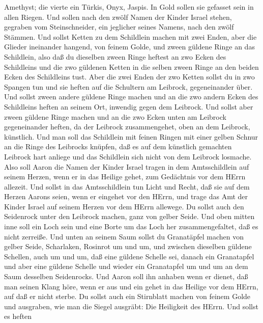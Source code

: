 Amethyst;  die vierte ein Türkis, Onyx, Jaspis. In Gold
sollen sie gefasset sein in allen Riegen.  Und sollen nach
den zwölf Namen der Kinder Israel stehen, gegraben vom Steinschneider,
ein jeglicher seines Namens, nach den zwölf Stämmen.  Und
sollst Ketten zu dem Schildlein machen mit zwei Enden, aber die Glieder
ineinander hangend, von feinem Golde,  und zween güldene
Ringe an das Schildlein, also daß du dieselben zween Ringe heftest an
zwo Ecken des Schildleins  und die zwo güldenen Ketten in
die selben zween Ringe an den beiden Ecken des Schildleins tust.
 Aber die zwei Enden der zwo Ketten sollst du in zwo
Spangen tun und sie heften auf die Schultern am Leibrock, gegeneinander
über.  Und sollst zween andere güldene Ringe machen und an
die zwo andern Ecken des Schildleins heften an seinem Ort, inwendig
gegen dem Leibrock.  Und sollst aber zween güldene Ringe
machen und an die zwo Ecken unten am Leibrock gegeneinander heften, da
der Leibrock zusammengehet, oben an dem Leibrock, künstlich.
 Und man soll das Schildlein mit feinen Ringen mit einer
gelben Schnur an die Ringe des Leibrocks knüpfen, daß es auf dem
künstlich gemachten Leibrock hart anliege und das Schildlein sich nicht
von dem Leibrock losmache.  Also soll Aaron die Namen der
Kinder Israel tragen in dem Amtsschildlein auf seinem Herzen, wenn er in
das Heilige gehet, zum Gedächtnis vor dem HErrn allezeit. 
Und sollst in das Amtsschildlein tun Licht und Recht, daß sie auf dem
Herzen Aarons seien, wenn er eingehet vor den HErrn, und trage das Amt
der Kinder Israel auf seinem Herzen vor dem HErrn allewege.
 Du sollst auch den Seidenrock unter den Leibrock machen,
ganz von gelber Seide.  Und oben mitten inne soll ein Loch
sein und eine Borte um das Loch her zusammengefaltet, daß es nicht
zerreiße.  Und unten an seinem Saum sollst du Granatäpfel
machen von gelber Seide, Scharlaken, Rosinrot um und um, und zwischen
dieselben güldene Schellen, auch um und um,  daß eine
güldene Schelle sei, danach ein Granatapfel und aber eine güldene
Schelle und wieder ein Granatapfel um und um an dem Saum desselben
Seidenrocks.  Und Aaron soll ihn anhaben wenn er dienet,
daß man seinen Klang höre, wenn er aus und ein gehet in das Heilige vor
dem HErrn, auf daß er nicht sterbe.  Du sollst auch ein
Stirnblatt machen von feinem Golde und ausgraben, wie man die Siegel
ausgräbt: Die Heiligkeit des HErrn.  Und sollst es heften
